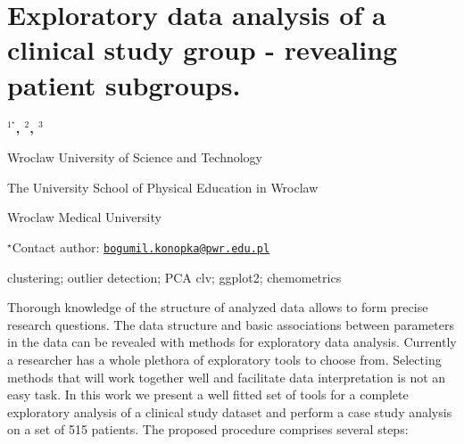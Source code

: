 \documentclass[\main/boa.tex]{subfiles}
\begin{document}
\section{Exploratory data analysis of a clinical study group - revealing patient
subgroups.}

\begin{center}
  {\bf {}$^{1^\star}$, $^{2}$, $^{3}$}
\end{center}

\vskip 0.3cm

\begin{affiliations}
\begin{enumerate}
\begin{minipage}{0.915\textwidth}
\centering
\item Wroclaw University of Science and Technology \\[-2pt]
\item The University School of Physical Education in Wroclaw \\[-2pt]
\item Wroclaw Medical University \\[-2pt]
\end{minipage}
\end{enumerate}
$^\star$Contact author: \href{mailto:bogumil.konopka@pwr.edu.pl}{\nolinkurl{bogumil.konopka@pwr.edu.pl}}\\
\end{affiliations}

\vskip 0.5cm

\begin{minipage}{0.915\textwidth}
\keywords clustering; outlier detection; PCA
\packages clv; ggplot2; chemometrics
\end{minipage}

\vskip 0.8cm

Thorough knowledge of the structure of analyzed data allows to form
precise research questions. The data structure and basic associations
between parameters in the data can be revealed with methods for
exploratory data analysis. Currently a researcher has a whole plethora
of exploratory tools to choose from. Selecting methods that will work
together well and facilitate data interpretation is not an easy task. In
this work we present a well fitted set of tools for a complete
exploratory analysis of a clinical study dataset and perform a case
study analysis on a set of 515 patients. The proposed procedure
comprises several steps:
\end{document}
